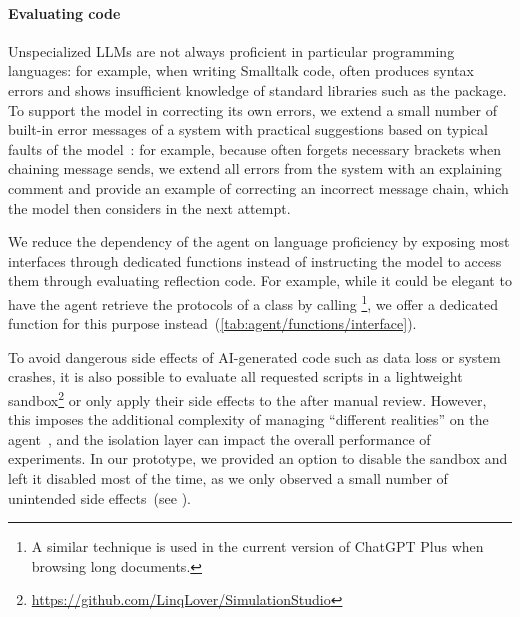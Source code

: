 \paragraph{Evaluating code}
Unspecialized LLMs are not always proficient in particular programming languages:
for example, when writing Smalltalk code, \gptfouro often produces syntax errors and shows insufficient knowledge of standard libraries such as the  package.
To support the model in correcting its own errors, we extend a small number of built-in error messages of a system with practical suggestions based on typical faults of the model~\cite{traver2010compiler}:
for example, because \gptfouro often forgets necessary brackets when chaining message sends, we extend all  errors from the system with an explaining comment and provide an example of correcting an incorrect message chain, which the model then considers in the next attempt.

We reduce the dependency of the agent on language proficiency by exposing most interfaces through dedicated functions instead of instructing the model to access them through evaluating reflection code.
For example, while it could be elegant to have the agent retrieve the protocols of a class by calling \footnote{A similar technique is used in the current version of ChatGPT Plus when browsing long documents.}, we offer a dedicated  function for this purpose instead~(\cref{tab:agent/functions/interface}).

To avoid dangerous side effects of AI-generated code such as data loss or system crashes, it is also possible to evaluate all requested scripts in a lightweight sandbox\footnote{\url{https://github.com/LinqLover/SimulationStudio}} or only apply their side effects to the after manual review.
However, this imposes the additional complexity of managing ``different realities'' on the agent~\cite{rehwaldt2012exploring}, and the isolation layer can impact the overall performance of experiments.
In our prototype, we provided an option to disable the sandbox and left it disabled most of the time, as we only observed a small number of unintended side effects~(see ).
